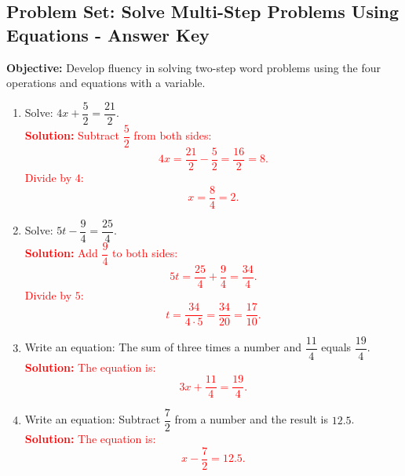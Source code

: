 \documentclass[12pt]{article}
\title{}
\date{}
\begin{document}
\subsection*{Problem Set: Solve Multi-Step Problems Using Equations - Answer Key}
\onehalfspacing

\begin{tcolorbox}[colframe=black!40, colback=gray!5, 
coltitle=black, colbacktitle=black!20, fonttitle=\bfseries\Large, 
title=Learning Objective, halign title=center, left=5pt, right=5pt, top=5pt, bottom=15pt]
\textbf{Objective:} Develop fluency in solving two-step word problems using the four operations and equations with a variable.
\end{tcolorbox}

\begin{tcolorbox}[colframe=black!60, colback=white, 
coltitle=black, colbacktitle=black!15, fonttitle=\bfseries\Large, 
title=Exercises (Part 1), halign title=center, left=10pt, right=10pt, top=10pt, bottom=5pt]
\begin{enumerate}[itemsep=0.25em]
    \item Solve: \( 4x + \dfrac{5}{2} = \dfrac{21}{2} \).\\
    \textcolor{red}{\textbf{Solution:} Subtract \(\dfrac{5}{2}\) from both sides: 
    \[
    4x = \dfrac{21}{2} - \dfrac{5}{2} = \dfrac{16}{2} = 8.
    \] 
    Divide by \(4\): 
    \[
    x = \dfrac{8}{4} = 2.
    \]}

    \item Solve: \( 5t - \dfrac{9}{4} = \dfrac{25}{4} \).\\
    \textcolor{red}{\textbf{Solution:} Add \(\dfrac{9}{4}\) to both sides: 
    \[
    5t = \dfrac{25}{4} + \dfrac{9}{4} = \dfrac{34}{4}.
    \] 
    Divide by \(5\): 
    \[
    t = \dfrac{34}{4 \cdot 5} = \dfrac{34}{20} = \dfrac{17}{10}.
    \]}

    \item Write an equation: The sum of three times a number and \(\dfrac{11}{4}\) equals \(\dfrac{19}{4}\).\\
    \textcolor{red}{\textbf{Solution:} The equation is: 
    \[
    3x + \dfrac{11}{4} = \dfrac{19}{4}.
    \]}

    \item Write an equation: Subtract \(\dfrac{7}{2}\) from a number and the result is \(12.5\).\\
    \textcolor{red}{\textbf{Solution:} The equation is: 
    \[
    x - \dfrac{7}{2} = 12.5.
    \]}
\end{enumerate}
\end{tcolorbox}
\end{document}
